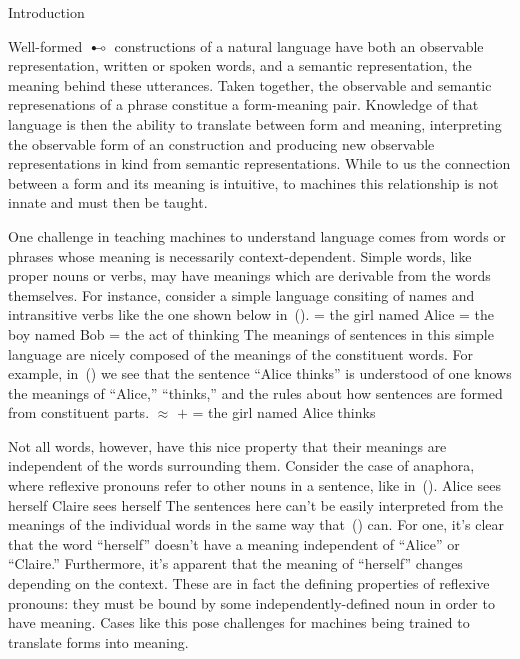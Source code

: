 \maketoc

\sec Introduction

Well-formed $\multimapdotbothB$ constructions of a natural language have both an observable 
representation, written or spoken words, and a semantic representation, the
meaning behind these utterances. Taken together, the observable and semantic
represenations of a phrase constitue a form-meaning pair. Knowledge of that
language is then the ability to translate between form and meaning, 
interpreting the observable form of an construction and producing new 
observable representations in kind from semantic representations. While to us
the connection between a form and its meaning is intuitive, to machines this
relationship is not innate and must then be taught. 

One challenge in teaching machines to understand language comes from words or
phrases whose meaning is necessarily context-dependent. Simple words, like
proper nouns or verbs, may have meanings which are derivable from the words 
themselves. For instance, consider a simple language consiting of names and
intransitive verbs like the one shown below in~(\nextx).
\pex
	\a{}   = the girl named Alice
	\a{}  = the boy named Bob
	\a{}  = the act of thinking
\xe
The meanings of sentences in this simple language are nicely composed of the
meanings of the constituent words. For example, in~(\nextx) we see that the
sentence ``Alice thinks'' is understood of one knows the meanings of ``Alice,''
``thinks,'' and the rules about how sentences are formed from constituent 
parts.
\ex{}
	 $\approx$  $+$  = the girl named Alice thinks
\xe

Not all words, however, have this nice property that their meanings are 
independent of the words surrounding them. Consider the case of anaphora, where
reflexive pronouns refer to other nouns in a sentence, like in~(\nextx).
\pex
	\a Alice sees herself
	\a Claire sees herself
\xe
The sentences here can't be easily interpreted from the meanings of the 
individual words in the same way that~(\blastx) can. For one, it's clear that
the word ``herself'' doesn't have a meaning independent of ``Alice'' or 
``Claire.'' Furthermore, it's apparent that the meaning of ``herself'' changes
depending on the context. These are in fact the defining properties of 
reflexive pronouns: they must be bound by some independently-defined noun in
order to have meaning. Cases like this pose challenges for machines being
trained to translate forms into meaning.

